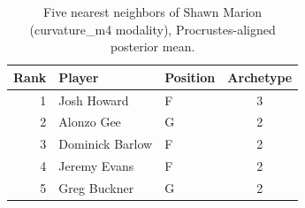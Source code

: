 \begin{table}[htbp]
  \centering\small
  \begin{tabular}{rllc}
    \toprule
    Rank & Player & Position & Archetype \\
    \midrule
    1 & Josh Howard & F & 3 \\
    2 & Alonzo Gee & G & 2 \\
    3 & Dominick Barlow & F & 2 \\
    4 & Jeremy Evans & F & 2 \\
    5 & Greg Buckner & G & 2 \\
    \bottomrule
  \end{tabular}
  \caption{Five nearest neighbors of Shawn Marion (curvature_m4 modality), Procrustes-aligned posterior mean.}
  \label{tab:Shawn_Marion_neighbors_curvature_m4}
\end{table}


